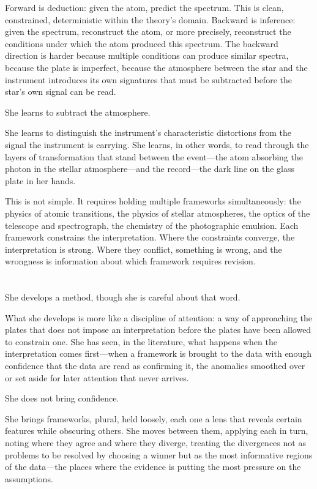 Forward is deduction: given the atom, predict the
spectrum. This is clean, constrained, deterministic
within the theory's domain. Backward is inference:
given the spectrum, reconstruct the atom, or more
precisely, reconstruct the conditions under which
the atom produced this spectrum. The backward
direction is harder because multiple conditions
can produce similar spectra, because the plate
is imperfect, because the atmosphere between the
star and the instrument introduces its own
signatures that must be subtracted before the
star's own signal can be read.

She learns to subtract the atmosphere.

She learns to distinguish the instrument's
characteristic distortions from the signal the
instrument is carrying. She learns, in other
words, to read through the layers of transformation
that stand between the event---the atom absorbing
the photon in the stellar atmosphere---and the
record---the dark line on the glass plate in
her hands.

This is not simple. It requires holding multiple
frameworks simultaneously: the physics of atomic
transitions, the physics of stellar atmospheres,
the optics of the telescope and spectrograph,
the chemistry of the photographic emulsion. Each
framework constrains the interpretation. Where
the constraints converge, the interpretation is
strong. Where they conflict, something is wrong,
and the wrongness is information about which
framework requires revision.

\section{}

She develops a method, though she is careful
about that word.

What she develops is more like a discipline of
attention: a way of approaching the plates that
does not impose an interpretation before the
plates have been allowed to constrain one. She
has seen, in the literature, what happens when
the interpretation comes first---when a framework
is brought to the data with enough confidence
that the data are read as confirming it, the
anomalies smoothed over or set aside for later
attention that never arrives.

She does not bring confidence.

She brings frameworks, plural, held loosely,
each one a lens that reveals certain features
while obscuring others. She moves between them,
applying each in turn, noting where they agree
and where they diverge, treating the divergences
not as problems to be resolved by choosing a
winner but as the most informative regions of
the data---the places where the evidence is
putting the most pressure on the assumptions.


